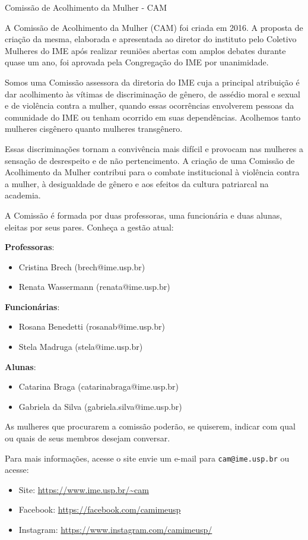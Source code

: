 \begin{subsecao}{Comissão de Acolhimento da Mulher - CAM}

A Comissão de Acolhimento da Mulher (CAM) foi criada em 2016. A proposta de 
criação da mesma, elaborada e apresentada ao diretor do instituto pelo 
Coletivo Mulheres do IME após realizar reuniões abertas com amplos debates 
durante quase um ano, foi aprovada pela Congregação do IME por unanimidade.

Somos uma Comissão assessora da diretoria do IME cuja a principal atribuição 
é dar acolhimento às vítimas de discriminação de gênero, de assédio moral e 
sexual e de violência contra a mulher, quando essas ocorrências envolverem 
pessoas da comunidade do IME ou tenham ocorrido em suas dependências. Acolhemos
tanto mulheres cisgênero quanto mulheres transgênero.

Essas discriminações tornam a convivência mais difícil e provocam nas mulheres
a sensação de desrespeito e de não pertencimento. A criação de uma Comissão de 
Acolhimento da Mulher contribui para o combate institucional à violência contra
a mulher, à desigualdade de gênero e aos efeitos da cultura patriarcal na academia.

A Comissão é formada por duas professoras, uma funcionária e duas alunas, 
eleitas por seus pares. Conheça a gestão atual: 

\textbf{Professoras}: 
\vspace{-15pt}
\begin{itemize}
  \item Cristina Brech (brech@ime.usp.br)
  \item Renata Wassermann (renata@ime.usp.br)
\end{itemize}

\textbf{Funcionárias}: 
\vspace{-15pt}
\begin{itemize}
  \item Rosana Benedetti (rosanab@ime.usp.br)
  \item Stela Madruga (stela@ime.usp.br)
\end{itemize}

\textbf{Alunas}: 
\vspace{-15pt}
\begin{itemize}
  \item Catarina Braga (catarinabraga@ime.usp.br)
  \item Gabriela da Silva (gabriela.silva@ime.usp.br)
\end{itemize}

As mulheres que procurarem a comissão poderão, se quiserem, indicar com qual ou 
quais de seus membros desejam conversar.

Para mais informações, acesse o site envie um e-mail para {\tt cam@ime.usp.br} ou acesse:
\begin{itemize}
  \item Site: \url{https://www.ime.usp.br/~cam}
  \item Facebook: \url{https://facebook.com/camimeusp}
  \item Instagram: \url{https://www.instagram.com/camimeusp/}
\end{itemize}


\end{subsecao}
